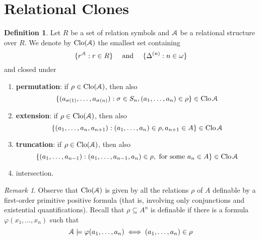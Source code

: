 \documentclass{amsart}
\theoremstyle{plain}
\theoremstyle{definition}
\newtheorem{definition}[theorem]{Definition}
\theoremstyle{remark}
\newtheorem{remark}[theorem]{Remark}
\def\phi{\varphi}
\DeclareMathOperator{\Clo}{Clo}
\begin{document}
\section{Relational Clones} 
\begin{definition}
    Let $R$ be a set of relation symbols and $\EuScript{A}$ be a relational structure over $R$.
    We denote by $\Clo(\EuScript{A})$ the smallest set containing 
    \begin{equation*}
        \{r^\EuScript{A} : r \in R\} \quad \text{ and } \quad \{\Delta^{(n)} : n \in \omega\}
    \end{equation*}
    and closed under 
    \begin{enumerate}
        \item \textbf{permutation}: if $\rho \in \Clo(\EuScript{A})$, then also
        \begin{equation*}
            \{(a_{\sigma(1)}, \ldots, a_{\sigma(n)}) : \sigma \in S_n, (a_1, \ldots, a_n) \in \rho\} \in \Clo{\EuScript{A}}
        \end{equation*} 
        \item \textbf{extension}: if $\rho \in \Clo(\EuScript{A})$, then also
        \begin{equation*}
            \{(a_{1}, \ldots, a_{n}, a_{n+1}) :  (a_1, \ldots, a_n) \in \rho, a_{n+1} \in A\} \in \Clo{\EuScript{A}}
        \end{equation*} 
        \item \textbf{truncation}: if $\rho \in \Clo(\EuScript{A})$, then also
        \begin{equation*}
            \{(a_1, \ldots, a_{n-1}): (a_1, \ldots, a_{n-1}, a_n) \in \rho, \text{ for some } a_n \in A \} \in \Clo{\EuScript{A}}
        \end{equation*}
        \item intersection. 
    \end{enumerate}
\end{definition}

\begin{remark}
    Observe that $\Clo(\EuScript{A})$ is given by all the relations $\rho$ of $A$ definable by a first-order primitive positive formula
    (that is, involving only conjunctions and existential quantifications). 
    Recall that $\rho \subseteq A^n$ is definable if there is a formula $\phi(x_1, \ldots, x_n)$ such that 
    \begin{equation*}
        \EuScript{A} \models \phi(a_1, \ldots, a_n) \iff (a_1, \ldots, a_n) \in \rho
    \end{equation*}
\end{remark}
\end{document}
